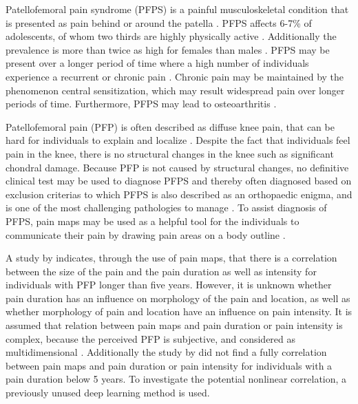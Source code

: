 Patellofemoral pain syndrome (PFPS) is a painful musculoskeletal condition that is presented as pain behind or around the patella \citep{Maclachlan2017, Smith2015}. PFPS affects 6-7\% of adolescents, of whom two thirds are highly physically active \citep{Rathleff2015}. Additionally the prevalence is more than twice as high for females than males \citep{Rathleff2015, Petersen2013}.
PFPS may be present over a longer period of time where a high number of individuals experience a recurrent or chronic pain \citep{Witvrouw2014}. Chronic pain may be maintained by the phenomenon central sensitization, which may result widespread pain over longer periods of time. Furthermore, PFPS may lead to osteoarthritis \citep{Petersen2013, Crossley2016}. 

\noindent
Patellofemoral pain (PFP) is often described as diffuse knee pain, that can be hard for individuals to explain and localize \citep{Witvrouw2014}. Despite the fact that individuals feel pain in the knee, there is no structural changes in the knee such as significant chondral damage. Because PFP is not caused by structural changes, no definitive clinical test may be used to diagnose PFPS and thereby often diagnosed based on exclusion criterias \citep{Petersen2013} to which PFPS is also described as an orthopaedic enigma, and is one of the most challenging pathologies to manage \citep{Dye2001}.
To assist diagnosis of PFPS, pain maps may be used as a helpful tool for the individuals to communicate their pain by drawing pain areas on a body outline \citep{Boudreau2016}.

\noindent
A study by \citeauthor{Boudreau2017} indicates, through the use of pain maps, that there is a correlation between the size of the pain and the pain duration as well as intensity for individuals with PFP longer than five years.\citep{Boudreau2017}\newline
\noindent
However, it is unknown whether pain duration has an influence on morphology of the pain and location, as well as  whether morphology of pain and location have an influence on pain intensity.
It is assumed that relation between pain maps and pain duration or pain intensity is complex, because the perceived PFP is subjective, and considered as multidimensional \citep{Dansie2013}. Additionally the study by \citeauthor{Boudreau2017} did not find a fully correlation between pain maps and pain duration or pain intensity for individuals with a pain duration below 5 years. To investigate the potential nonlinear correlation, a previously unused deep learning method is used. 

